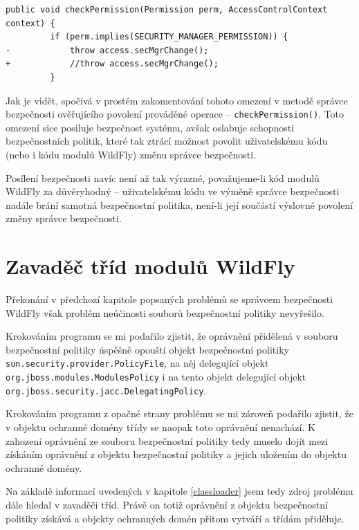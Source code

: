 \begin{lstlisting}[caption=Záplata správce bezpečnosti WildFly umožňující vypnutí správce bezpečnosti (zkráceno), label=patchSM]
     public void checkPermission(Permission perm, AccessControlContext context) {
         if (perm.implies(SECURITY_MANAGER_PERMISSION)) {
-            throw access.secMgrChange();
+            //throw access.secMgrChange();
         }
\end{lstlisting}

Jak je vidět, spočívá v prostém zakomentování tohoto omezení v metodě správce bezpečnosti ověřujícího povolení prováděné operace -- {\tt checkPermission()}. Toto omezení sice posiluje bezpečnost systému, avšak oslabuje schopnosti bezpečnostních politik, které tak ztrácí možnost povolit uživatelskému kódu (nebo i kódu modulů WildFly) změnu správce bezpečnosti.

Posílení bezpečnosti navíc není až tak výrazné, považujeme-li kód modulů WildFly za důvěryhodný -- uživatelskému kódu ve výměně správce bezpečnosti nadále brání samotná bezpečnostní politika, není-li její součástí výslovné povolení změny správce bezpečnosti.

\section{Zavaděč tříd modulů WildFly}

Překonání v předchozí kapitole popsaných problémů se správcem bezpečnosti WildFly však problém neúčinosti souborů bezpečnostní politiky nevyřešilo.

Krokováním programu se mi podařilo zjistit, že oprávnění přidělená v souboru bezpečnostní politiky úspěšně opouští objekt bezpečnostní politiky {\tt sun.security.provider.PolicyFile}, na něj delegující objekt {\tt org.jboss.modules.ModulesPolicy} i na tento objekt delegující objekt {\tt org.jboss.security.jacc.DelegatingPolicy}.

Krokováním programu z opačné strany problému se mi zároveň podařilo zjistit, že v objektu ochranné domény třídy se naopak toto oprávnění nenachází. K zahození oprávnění ze souboru bezpečnostní politiky tedy muselo dojít mezi získáním oprávnění z objektu bezpečnostní politiky a jejich uložením do objektu ochranné domény.

Na základě informací uvedených v kapitole \ref{classloader} jsem tedy zdroj problému dále hledal v zavaděči tříd. Právě on totiž oprávnění z objektu bezpečnostní politiky získává a objekty ochranných domén přitom vytváří a třídám přiděluje.

